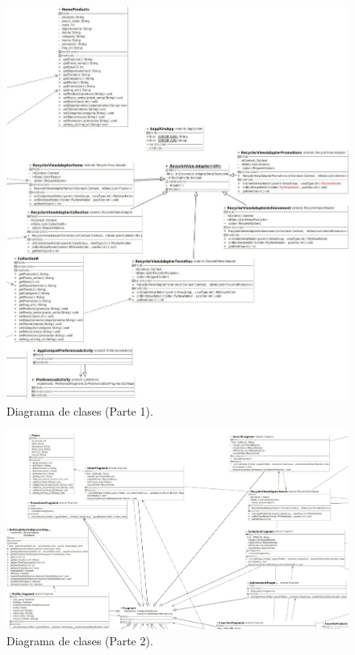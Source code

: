\FloatBarrier
\begin{figure}[htbp!]
		\centering
			\includegraphics[width=1.1 \textwidth]{imagenes/Diagramas_UserApp/Nuevos_diagramas/diagrama2_1}
		\caption{Diagrama de clases (Parte 1).}
		\label{image:clases1}
\end{figure}
\FloatBarrier

\FloatBarrier
\begin{figure}[htbp!]
		\centering
			\includegraphics[width=1.1 \textwidth]{imagenes/Diagramas_UserApp/Nuevos_diagramas/diagrama2_2}
		\caption{Diagrama de clases (Parte 2).}
		\label{image:clases2}
\end{figure}
\FloatBarrier

